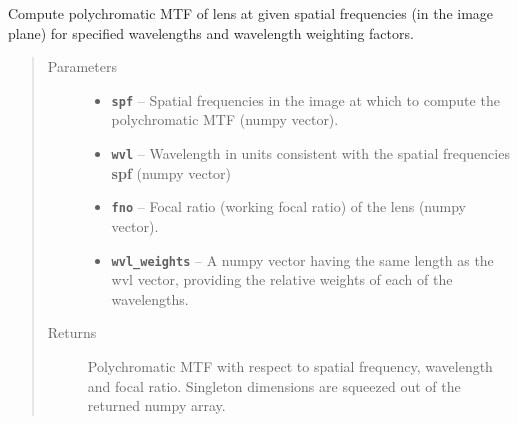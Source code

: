 \documentclass[a4paper,10pt,english]{sphinxmanual}
\begin{document}
\begin{fulllineitems}
\label{packages:optics.pmtf}
Compute polychromatic MTF of lens at given spatial frequencies (in the image plane) for specified wavelengths
and wavelength weighting factors.
\begin{quote}\begin{description}
\item[{Parameters}] \leavevmode\begin{itemize}
\item {} 
\textbf{\texttt{spf}} -- Spatial frequencies in the image at which to compute the polychromatic MTF (numpy vector).

\item {} 
\textbf{\texttt{wvl}} -- Wavelength in units consistent with the spatial frequencies \textbf{spf} (numpy vector)

\item {} 
\textbf{\texttt{fno}} -- Focal ratio (working focal ratio) of the lens (numpy vector).

\item {} 
\textbf{\texttt{wvl\_weights}} -- A numpy vector having the same length as the wvl vector, providing the relative weights of each
of the wavelengths.

\end{itemize}

\item[{Returns}] \leavevmode
Polychromatic MTF with respect to spatial frequency, wavelength and focal ratio.
Singleton dimensions are squeezed out of the returned numpy array.

\end{description}\end{quote}

\end{fulllineitems}

\end{document}
